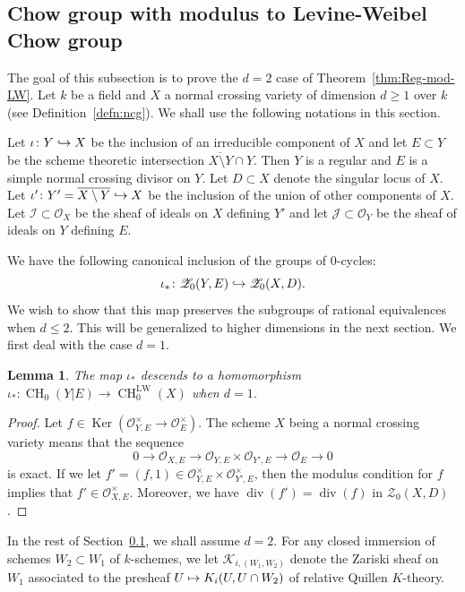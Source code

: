\documentclass[JEP,XML,SOM,Unicode,published]{cedram}
\let\mathcal\mathscr
\def\mto{\mathchoice{\longmapsto}{\mapsto}{\mapsto}{\mapsto}}
\def\hto{\mathrel{\lhook\joinrel\to}}
\let\inj\hto
\newcommand{\LW}{\mathrm{LW}}
\newtheorem{lem}[thm]{Lemma}
\theoremstyle{definition}
\newcommand{\thmref}{Theorem~\ref}
\newcommand{\defref}{Definition~\ref}
\newcommand{\secref}{Section~\ref}
\newcommand{\sI}{{\mathcal I}}
\newcommand{\sJ}{{\mathcal J}}
\newcommand{\sK}{{\mathcal K}}
\newcommand{\sO}{{\mathcal O}}\let\cO\sO
\newcommand{\sZ}{{\mathcal Z}}
\DeclareMathOperator{\CH}{CH}
\DeclareMathOperator{\divf}{div}
\DeclareMathOperator{\Ker}{Ker}
\let\ov\overline
\begin{document}
\subsection{Chow group with modulus to
Levine-Weibel Chow group}\label{sec:CMLW}
The goal of this subsection is to prove the $d =2$ case of \thmref{thm:Reg-mod-LW}.
Let $k$ be a field and $X$ a normal crossing variety of dimension $d \ge 1$ over $k$
(see \defref{defn:ncg}).
We shall use the following notations in this section.

Let $\iota \colon Y \inj X$ be the inclusion of an irreducible component
of $X$ and let $E \subset Y$ be the scheme theoretic intersection
$\ov{X \setminus Y} \cap Y$. Then $Y$ is a regular
and $E$ is a simple normal crossing
divisor on $Y$. Let $D \subset X$ denote the singular locus of $X$.
Let $\iota' \colon Y' = \ov{X \setminus Y} \inj X$ be the inclusion of the
union of other components of $X$.
Let $\sI \subset \sO_X$ be the sheaf of ideals on $X$ defining $Y'$
and let $\sJ \subset \sO_Y$ be the sheaf of ideals on $Y$ defining $E$.

We have the following canonical inclusion of the groups of $0$-cycles:
\begin{equation}\label{eqn:$0$-cycle-incl}
\iota_* \colon \sZ_0(Y, E) \inj \sZ_0(X, D).
\end{equation}
We wish to show that this map preserves the subgroups
of rational equivalences when $d \le 2$. This will be generalized
to higher dimensions in the next section. We first deal with the case $d =1$.

\begin{lem}\label{lem:NC-surface-3}
The map $\iota_*$ descends to a homomorphism
\hbox{$\iota_* \colon \CH_0(Y|E)\!\to\!\CH^{\LW}_0(X)$} when $d = 1$.
\end{lem}
\begin{proof}
Let $f \in \Ker(\sO^{\times}_{Y, E} \to
\sO^{\times}_{E})$.
The scheme $X$ being a normal crossing variety means that the
sequence
\begin{equation}\label{eqn:NC-surface-3-0}
0 \to \sO_{X, E} \to \sO_{Y,E} \times \sO_{Y',E} \to \sO_{E} \to 0
\end{equation}
is exact.
If we let $f' = (f,1) \in \sO^{\times}_{Y,E} \times \sO^{\times}_{Y',E}$, then
the modulus condition for $f$ implies that $f' \in \sO^{\times}_{X,E}$.
Moreover, we have $\divf(f') = \divf(f)$ in $\sZ_0(X,D)$.
\end{proof}

In the rest of \secref{sec:CMLW}, we shall assume $d = 2$.
For any closed immersion of schemes $W_2 \subset W_1$ of $k$-schemes, we let
$\sK_{i, (W_1, W_2)}$ denote the Zariski sheaf on $W_1$ associated to the
presheaf $U \mto K_i(U, U \cap W_2)$ of relative Quillen $K$-theory.
\end{document}
